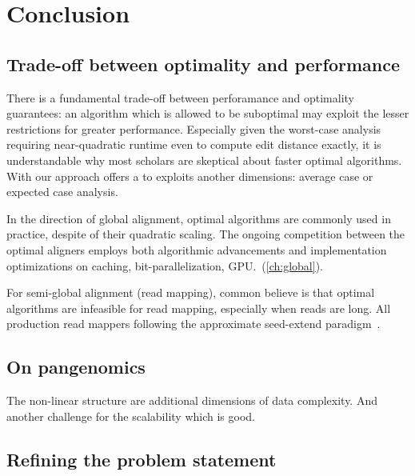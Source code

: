 \chapter{Conclusion} \label{ch:conclusion}





\section{Trade-off between optimality and performance}

There is a fundamental trade-off between perforamance and optimality guarantees:
an algorithm which is allowed to be suboptimal may exploit the lesser
restrictions for greater performance. Especially given the worst-case analysis
requiring near-quadratic runtime even to compute edit distance exactly, it is
understandable why most scholars are skeptical about faster optimal algorithms.
With our \A approach  offers a to exploits another dimensions: average case or expected case analysis.


In the direction of global alignment, optimal algorithms are commonly used in
practice, despite of their quadratic scaling. The ongoing competition between
the optimal aligners employs both algorithmic advancements and implementation
optimizations on caching, bit-parallelization, GPU.~(\cref{ch:global}).

For semi-global alignment (read mapping), common believe is that optimal
algorithms are infeasible for read mapping, especially when reads are long. All
production read mappers following the approximate seed-extend
paradigm~\cite[including 107 aligners]{alser2021technology}.

\section{On pangenomics}

The non-linear structure are additional dimensions of data complexity. And
another challenge for the scalability which is good.



\section{Refining the problem statement}

